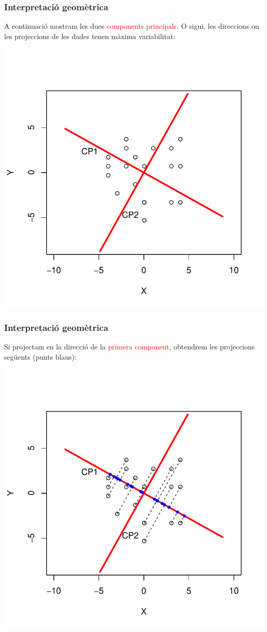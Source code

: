 \documentclass[12pt,t]{beamer}
\newcommand{\red}[1]{\textcolor{red}{#1}}
\theoremstyle{plain}
\theoremstyle{definition}
\begin{document}
\begin{frame}
\frametitle{Interpretació geomètrica}
{\small A continuació mostram les dues \red{components principals.} O sigui, les direccions on les projeccions de les 
dades tenen màxima variabilitat:}
\vspace*{-1cm}

\includegraphics{ACP2print-002}
\end{frame}

\begin{frame}
\frametitle{Interpretació geomètrica}
{\small Si projectam en la direcció de la \red{primera component}, obtendrem les projeccions següents (punts blaus):}
\vspace*{-1cm}

\includegraphics{ACP2print-003}
\end{frame}
\end{document}
